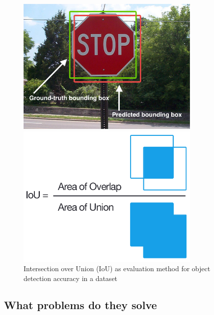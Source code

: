 \begin{enumerate}
		\begin{figure}[htbp]
			\centering
			\begin{minipage}{0.45\textwidth}
				\centering
				\includegraphics[width=0.8\textwidth]{images/iou_stop_sign.jpg} %
			\end{minipage}\hfill
			\begin{minipage}{0.45\textwidth}
				\centering
				\includegraphics[width=0.8\textwidth]{images/iou_equation.png} %
			\end{minipage}
			\caption{Intersection over Union (IoU) as evaluation method for object detection accuracy in a dataset}
			\label{f:iou}
		\end{figure}
	
	
	
\end{enumerate}




\subsection{What problems do they solve}\label{s:ltask}


